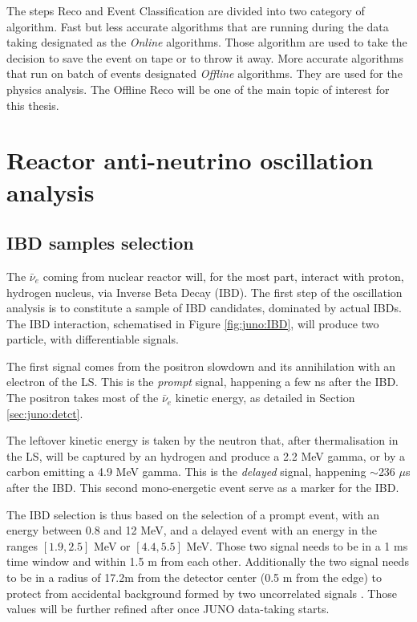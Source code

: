 \documentclass[../main.tex]{subfiles}
\begin{document}
The steps Reco and Event Classification are divided into two category of algorithm. Fast but less accurate algorithms that are running during the data taking designated as the \textit{Online} algorithms. Those algorithm are used to take the decision to save the event on tape or to throw it away. More accurate algorithms that run on batch of events designated \textit{Offline} algorithms. They are used for the physics analysis. The Offline Reco will be one of the main topic of interest for this thesis.


\section{Reactor anti-neutrino oscillation analysis}
\label{sec:juno:Fit}


\subsection{IBD samples selection}

The $\bar{\nu}_e$ coming from nuclear reactor will, for the most part, interact with proton, hydrogen nucleus, via Inverse Beta Decay (IBD).
The first step of the oscillation analysis is to constitute a sample of IBD candidates, dominated by actual IBDs. The IBD interaction, schematised in Figure \ref{fig:juno:IBD}, will produce two particle, with differentiable signals.

The first signal comes from the positron slowdown and its annihilation with an electron of the LS. This is the \textit{prompt} signal, happening a few ns after the IBD. The positron takes most of the $\bar{\nu}_e$ kinetic energy, as detailed in Section \ref{sec:juno:detct}.

The leftover kinetic energy is taken by the neutron that, after thermalisation in the LS, will be captured by an hydrogen and produce a 2.2 MeV gamma, or by a carbon emitting a 4.9 MeV gamma. This is the \textit{delayed} signal, happening $\sim$236 $\mu$s after the IBD. This second mono-energetic event serve as a marker for the IBD.

The IBD selection is thus based on the selection of a prompt event, with an energy between 0.8 and 12 MeV, and a delayed event with an energy in the ranges $[1.9, 2.5]$ MeV or $[4.4, 5.5]$ MeV. Those two signal needs to be in a 1 ms time window and within 1.5 m from each other. Additionally the two signal needs to be in a radius of 17.2m from the detector center (0.5 m from the edge) to protect from accidental background formed by two uncorrelated signals \cite{abusleme_potential_2024}. Those values will be further refined after once JUNO data-taking starts.
\end{document}
